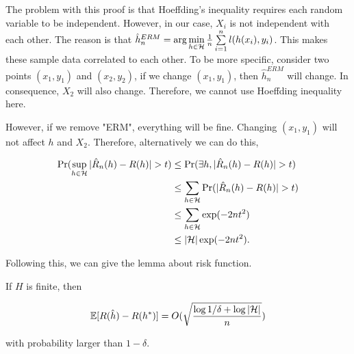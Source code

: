 \documentclass[../main.tex]{subfiles}
\begin{document}
	The problem with this proof is that Hoeffding's inequality requires each random variable to be independent. However, in our case, $X_i$ is not independent with each other. The reason is that $\hat{h}_n^{ERM} = \arg\min\limits_{h\in \mathcal{H}} \frac{1}{n} \sum\limits_{i=1}^n l(h(x_i),y_i)$. This makes these sample data correlated to each other. To be more specific, consider two points $(x_1, y_1)$ and $(x_2, y_2)$, if we change $(x_1,y_1)$, then $\hat{h}_n^{ERM}$ will change. In consequence, $X_2$ will also change. Therefore, we cannot use Hoeffding inequality here.
	
	However, if we remove "ERM", everything will be fine. Changing $(x_1, y_1)$ will not affect $h$ and $X_2$. Therefore, alternatively we can do this, 
	
	\begin{equation*}
		\begin{aligned}
			\Pr(\sup\limits_{h\in \mathcal{H}}|\hat{R}_n (h) - R(h)| > t) & \leq  \Pr(\exists h, |\hat{R}_n (h) - R(h)| > t) \\	
														& \leq \sum\limits_{h\in \mathcal{H}} \Pr(|\hat{R}_n (h) - R(h)| > t) \\
														& \leq  \sum\limits_{h\in \mathcal{H}}  \exp(-2nt^2)\\
														& \leq |\mathcal{H}|  \exp(-2nt^2).
		\end{aligned}
	\end{equation*}
	
	Following this, we can give the lemma about risk function.
	
	\begin{lemma}
		If $H$ is finite, then
		
		\begin{equation*}
			\begin{aligned}
				\mathbb{E}[R(\hat{h}) - R(h^*)] = O(\sqrt{\frac{\log 1 / \delta + \log |\mathcal{H}|}{n}})				
			\end{aligned}
		\end{equation*}
		
		with probability larger than $1-\delta$.
	\end{lemma}
\end{document}
